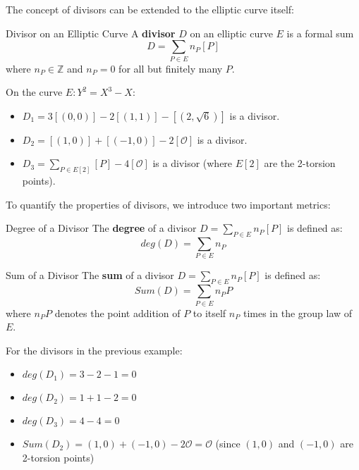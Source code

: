 \documentclass{article}
\begin{document}
The concept of divisors can be extended to the elliptic curve itself:

\begin{definition}{Divisor on an Elliptic Curve}{}
A \textbf{divisor} $D$ on an elliptic curve $E$ is a formal sum
    \begin{equation}
        D = \sum_{P \in E} n_P [P]
    \end{equation}
where $n_P \in \mathbb{Z}$ and $n_P = 0$ for all but finitely many $P$.
\end{definition}

On the curve $E: Y^2 = X^3 - X$:
\begin{itemize}
    \item $D_1 = 3[(0,0)] - 2[(1,1)] - [(2,\sqrt{6})]$ is a divisor.
    \item $D_2 = [(1,0)] + [(-1,0)] - 2[\mathcal{O}]$ is a divisor.
    \item $D_3 = \sum_{P \in E[2]} [P] - 4[\mathcal{O}]$ is a divisor (where $E[2]$ are the 2-torsion points).
\end{itemize}

To quantify the properties of divisors, we introduce two important metrics:

\begin{definition}{Degree of a Divisor}{}
The \textbf{degree} of a divisor $D = \sum_{P \in E} n_P [P]$ is defined as:
    \begin{equation}
        deg(D) = \sum_{P \in E} n_P
    \end{equation}
\end{definition}

\begin{definition}{Sum of a Divisor}{}
The \textbf{sum} of a divisor $D = \sum_{P \in E} n_P [P]$ is defined as:
    \begin{equation}
        Sum(D) = \sum_{P \in E} n_P P
    \end{equation}
where $n_P P$ denotes the point addition of $P$ to itself $n_P$ times in the group law of $E$.
\end{definition}

For the divisors in the previous example:
\begin{itemize}
    \item $deg(D_1) = 3 - 2 - 1 = 0$
    \item $deg(D_2) = 1 + 1 - 2 = 0$
    \item $deg(D_3) = 4 - 4 = 0$
    \item $Sum(D_2) = (1,0) + (-1,0) - 2\mathcal{O} = \mathcal{O}$ (since $(1,0)$ and $(-1,0)$ are 2-torsion points)
\end{itemize}
\end{document}
